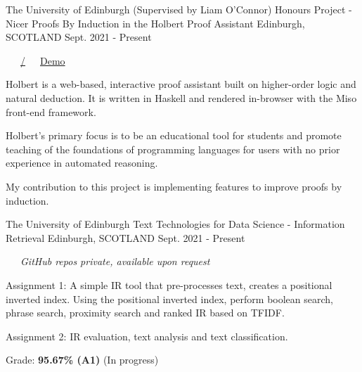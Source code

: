 \begin{cventries}
  \cventry
    {The University of Edinburgh (Supervised by Liam O'Connor)} %
    {Honours Project - Nicer Proofs By Induction in the Holbert Proof Assistant} %
    {Edinburgh, SCOTLAND} %
    {Sept. 2021 - Present} %
    {
      \color{awesome} \color{graytext}\ \ \ \href{https://github.com/chrisjpm/holbert}{\faGithub\acvHeaderIconSep\@chrisjpm/\@holbert}\ \ \ \href{http://liamoc.net/holbert}{\faGlobe\acvHeaderIconSep\@Holbert Demo}%
      \vspace{1.6em}
      \begin{cvitems} %
        \item Holbert is a web-based, interactive proof assistant built on higher-order logic and natural deduction. It is written in Haskell and rendered in-browser with the Miso front-end framework.
        \item Holbert’s primary focus is to be an educational tool for students and promote teaching of the foundations of programming languages for users with no prior experience in automated reasoning.
        \item My contribution to this project is implementing features to improve proofs by induction.
      \end{cvitems}
    }
    
  \cventry
    {The University of Edinburgh} %
    {Text Technologies for Data Science - Information Retrieval} %
    {Edinburgh, SCOTLAND} %
    {Sept. 2021 - Present} %
    {
      \color{awesome}\color{graytext}\ \ \ \textit{GitHub repos private, available upon request}
      \vspace{1.6em}
      \begin{cvitems} %
        \item Assignment 1: A simple IR tool that pre-processes text, creates a positional inverted index. Using the positional inverted index, perform boolean search, phrase search, proximity search and ranked IR based on TFIDF.
        \item Assignment 2: IR evaluation, text analysis and text classification.
        \item Grade: \textbf{95.67\% (A1)} (In progress)
      \end{cvitems}
    }
    

\end{cventries}
